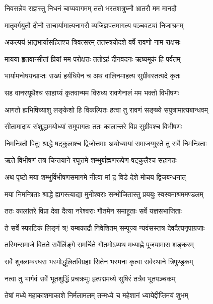 \twolineshloka
{निवसन्नेव राज्ञस्तु निधनं चाप्यवागमम्}
{ततो भरतशत्रुघ्नौ भ्रातरौ मम मानदौ}%

\twolineshloka
{मातृवर्गयुतौ दीनौ साचार्यामात्यनागरौ}
{व्यजिज्ञपतमागत्य पञ्चवट्यां निजाश्रमम्}%

\twolineshloka
{अकल्पयं भ्रातृभार्यासहितश्च त्रिवत्सरम्}
{ततस्त्रयोदशे वर्षे रावणो नाम राक्षसः}%

\twolineshloka
{मायया हृतवान्सीतां प्रियां मम परोक्षतः}
{ततोऽहं दीनवदनः ऋष्यमूकं हि पर्वतम्}%

\twolineshloka
{भार्यामन्वेषयन्प्राप्तः सख्यं हर्यधिपेन च}
{अथ वालिनमाहत्य सुग्रीवस्तत्पदे कृतः}%

\twolineshloka
{सह वानरयूथैश्च साहाय्यं कृतवान्मम}
{विरुध्य रावणेनालं मम भक्तो विभीषणः}%

\twolineshloka
{आगतो ह्यभिषिच्याशु लङ्केशो हि विकल्पितः}
{हत्वा तु रावणं सङ्ख्ये सपुत्रामात्यबान्धवम्}%

\twolineshloka
{सीतामादाय संशुद्धामयोध्यां समुपागतः}
{ततः कालान्तरे विप्र सुग्रीवश्च विभीषणः}%

\twolineshloka
{निमन्त्रितौ पितुः श्राद्धे षट्कुलाश्च द्विजोत्तमाः}
{अयोध्यायां समाजग्मुस्ते तु सर्वे निमन्त्रिताः}%

\twolineshloka
{ऋते विभीषणं तत्र चिन्तयाने रघूत्तमे}
{शम्भुर्बाह्मणरूपेण षट्कुलैश्च सहागतः}%

\twolineshloka
{अथ पृष्टो मया शम्भुर्विभीषणसमागमे}
{नीत्वा मां द्र विडे देशे मोचय द्विजबन्धनात्}%

\twolineshloka
{मया निमन्त्रिताः श्राद्धे ह्यगस्त्याद्या मुनीश्वराः}
{सम्भोजितास्तु प्रययुः स्वस्वमाश्रममण्डलम्}%

\twolineshloka
{ततः कालांतरे विप्रा देवा दैत्या नरेश्वराः}
{गौतमेन समाहूताः सर्वे यज्ञसभाजिताः}%

\twolineshloka
{ते सर्वे स्फाटिकं लिङ्गं त्र्! यम्बकाद्रौ निवेशितम्}
{सम्पूज्य न्यवंसस्तत्र देवदैत्यनृपाग्रजाः}%

\twolineshloka
{तस्मिन्समाजे वितते सर्वैर्लिङ्गे समर्चिते}
{गौतमोऽप्यथ मध्याह्ने पूजयामास शङ्करम्}%

\twolineshloka
{सर्वे शुक्लाम्बरधरा भस्मोद्धूलितविग्रहाः}
{सितेन भस्मना कृत्वा सर्वस्थाने त्रिपुण्ड्रकम्}%

\twolineshloka
{नत्वा तु भार्गवं सर्वे भूतशुद्धिं प्रचक्रमुः}
{हृत्पद्ममध्ये सुषिरं तत्रैव भूतपञ्चकम्}%

\twolineshloka
{तेषां मध्ये महाकाशमाकाशे निर्मलामलम्}
{तन्मध्ये च महेशानं ध्यायेद्दीप्तिमयं शुभम्}%

